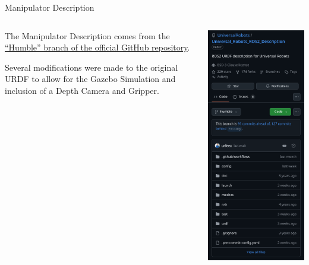 \begin{frame}{Manipulator Description}
    \begin{columns}
        \begin{column}{.75\linewidth}
            The Manipulator Description comes from the \href{https://github.com/UniversalRobots/Universal_Robots_ROS2_Description/tree/humble}{``Humble'' branch of the official GitHub repository}.

            Several modifications were made to the original URDF to allow for the Gazebo Simulation and inclusion of a Depth Camera and Gripper.
        \end{column}
        \begin{column}{.25\linewidth}
            \begin{center}
                \includegraphics[width=.75\textwidth]{media/UR5DescriptionRepo.png}
            \end{center}
        \end{column}
    \end{columns}
\end{frame}
